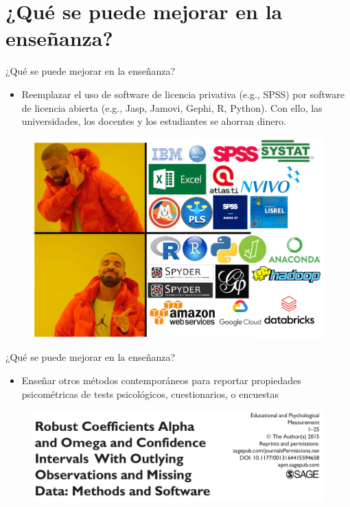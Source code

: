 \documentclass{beamer}
\begin{document}
\section{¿Qué se puede mejorar en la enseñanza?}
\begin{frame}{¿Qué se puede mejorar en la enseñanza?}
\begin{itemize}
\item Reemplazar el uso de software de licencia privativa (e.g., SPSS) por software de licencia abierta (e.g., Jasp, Jamovi, Gephi, R, Python). Con ello, las universidades, los docentes y los estudiantes se ahorran dinero. 
\end{itemize}
\begin{figure}
\includegraphics[width=.5\textwidth]{thisnot.png}
\end{figure}
\end{frame}

\begin{frame}{¿Qué se puede mejorar en la enseñanza?}
\begin{itemize}
\item Enseñar otros métodos contemporáneos para reportar propiedades psicométricas de tests psicológicos, cuestionarios, o encuestas \cite{Zhang2016}
\end{itemize}    
\begin{figure}
\includegraphics[width=.9\textwidth]{zhang.png}
\end{figure}
\end{frame}
\end{document}
